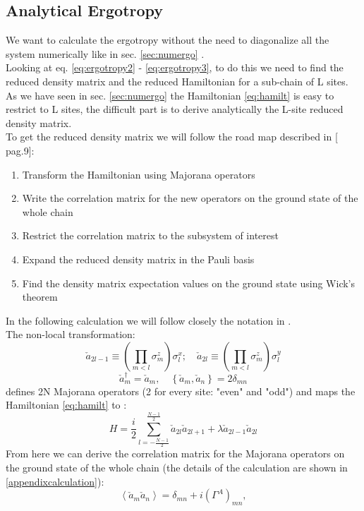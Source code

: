 \documentclass[10pt,a4paper]{article}
\begin{document}
	\subsection{Analytical Ergotropy}\label{sec:analerg}
	We want to calculate the ergotropy without the need to diagonalize all the system numerically like in sec. \ref{sec:numergo} .\\	
	Looking at eq. \ref{eq:ergotropy2} - \ref{eq:ergotropy3}, to do this we need to find the reduced density matrix and the reduced Hamiltonian for a sub-chain of L sites.\\	
	As we have seen  in sec. \ref{sec:numergo} the Hamiltonian \ref{eq:hamilt} is easy to restrict to L sites, the difficult part is to derive analytically the L-site reduced density matrix.	\\
	\newline
	To get the reduced density matrix we will follow the road map described in [\cite{latorre2003ground} pag.9]:
	\begin{enumerate}
		\item Transform the Hamiltonian using Majorana operators
		\item Write the correlation matrix for the new operators on the ground state of the whole chain
		\item Restrict the correlation matrix to the subsystem of interest
		\item Expand the reduced density matrix in the Pauli basis
		\item Find the density matrix expectation values on the ground state using Wick's theorem 
	\end{enumerate}
In the following calculation we will follow closely the notation in \cite{latorre2003ground}.\\
The non-local transformation:
	\begin{equation}\label{majorana}
	\check{a}_{2 l-1} \equiv\left(\prod_{m<l} \sigma_{m}^{z}\right) \sigma_{l}^{x} ; \quad
	\check{a}_{2 l} \equiv\left(\prod_{m<l} \sigma_{m}^{z}\right) \sigma_{l}^{y}
	\end{equation}
	\begin{equation}\label{eq:anticomm}
	\check{a}_{m}^{\dagger}=\check{a}_{m}, \quad\left\{\check{a}_{m}, \check{a}_{n}\right\}=2 \delta_{m n}\end{equation}
	defines 2N Majorana operators (2 for every site: "even" and "odd") and maps the Hamiltonian \ref{eq:hamilt} to :
	\begin{equation}\label{eq:hamiltwitha}
	H =\frac{i}{2} \sum_{l=-\frac{N-1}{2}}^{\frac{N-1}{2}} \check{a}_{2 l} \check{a}_{2 l+1}  
	+ \lambda \check{a}_{2 l-1} \check{a}_{2 l}
	\end{equation}
	From here we can derive the correlation matrix for the Majorana operators on the ground state of the whole chain (the details of the calculation are shown in \ref{appendixcalculation}):
	\begin{equation}\label{eq:corrmatr1}
	\left\langle\check{a}_{m} \check{a}_{n}\right\rangle=\delta_{m n}+i\left(\Gamma^{A}\right)_{m n}, 
	\end{equation}
	
\end{document}
